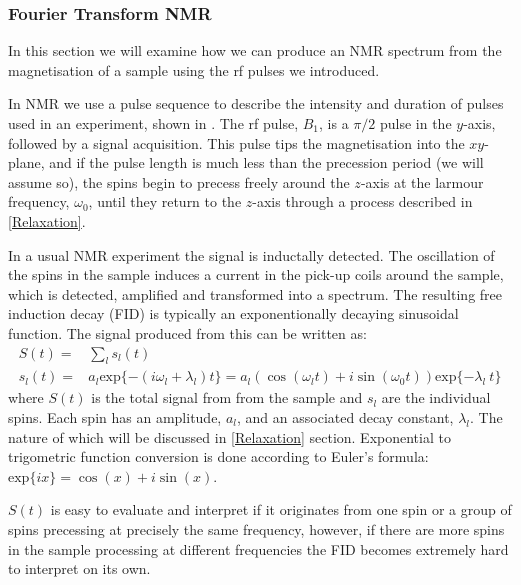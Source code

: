 \subsubsection{Fourier Transform NMR}

In this section we will examine how we can produce an NMR spectrum from the magnetisation of a sample
using the rf pulses we introduced.

In NMR we use a pulse sequence to describe the intensity and duration of pulses used in an
experiment, shown in . The rf pulse, $B_1$, is a $\pi/2$ pulse in the $y$-axis, followed by a signal
acquisition. This pulse tips the magnetisation into the $xy$-plane, and if the pulse length is much less than the
precession period (we will assume so), the spins begin to precess freely around the $z$-axis at the larmour
frequency, $\omega_0$, until they return to the $z$-axis through a process described in \ref{Relaxation}.

In a usual NMR experiment the signal is inductally detected. The oscillation of the spins in the sample induces
a current in the pick-up coils around the sample, which is detected, amplified and transformed into a spectrum.
The resulting free induction decay (FID) is typically an exponentionally decaying sinusoidal function. The signal
produced from this can be written as:
\begin{align}\label{eqn:signal}
  S(t) =& \sum_l s_l(t) \\
  s_l(t) =& a_l\text{exp}\{-(i\omega_l+\lambda_l)t\} = a_l(\cos(\omega_lt) + i\sin(\omega_0t))\text{exp}\{-\lambda_l~t\}
\end{align}
where $S(t)$ is the total signal from from the sample and $s_l$ are the individual spins. Each spin has an amplitude, $a_l$, and an associated decay constant, $\lambda_l$. The nature of which will be discussed in \ref{Relaxation} section. Exponential to trigometric function conversion
is done according to Euler's formula: $\text{exp}\{ix\} = \cos(x) + i\sin(x)$.

$S(t)$ is easy to evaluate and interpret if it originates from one spin or a group of spins precessing
at precisely the same frequency, however, if there are more spins in the sample processing at different frequencies
the FID becomes extremely hard to interpret on its own.

